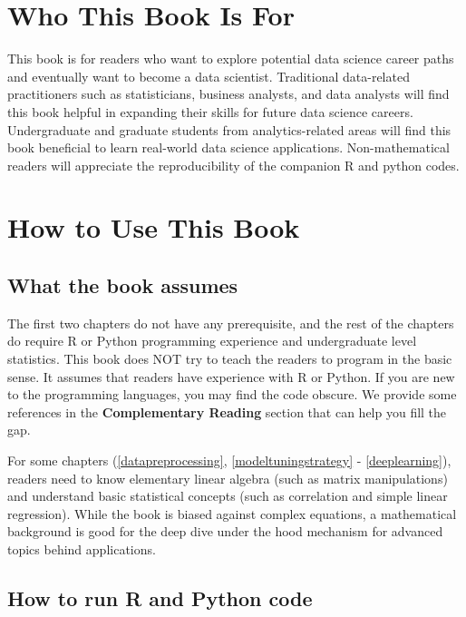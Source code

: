 \documentclass[
  12pt,
]{krantz}
\begin{document}
\hypertarget{who-this-book-is-for}{%
\section*{Who This Book Is For}\label{who-this-book-is-for}}


This book is for readers who want to explore potential data science career paths and eventually want to become a data scientist. Traditional data-related practitioners such as statisticians, business analysts, and data analysts will find this book helpful in expanding their skills for future data science careers. Undergraduate and graduate students from analytics-related areas will find this book beneficial to learn real-world data science applications. Non-mathematical readers will appreciate the reproducibility of the companion R and python codes.

\hypertarget{how-to-use-this-book}{%
\section*{How to Use This Book}\label{how-to-use-this-book}}


\hypertarget{what-the-book-assumes}{%
\subsection*{What the book assumes}\label{what-the-book-assumes}}


The first two chapters do not have any prerequisite, and the rest of the chapters do require R or Python programming experience and undergraduate level statistics. This book does NOT try to teach the readers to program in the basic sense. It assumes that readers have experience with R or Python.
If you are new to the programming languages, you may find the code obscure. We provide some references in the \textbf{Complementary Reading} section that can help you fill the gap.

For some chapters (\ref{datapreprocessing}, \ref{modeltuningstrategy} - \ref{deeplearning}), readers need to know elementary linear algebra (such as matrix manipulations) and understand basic statistical concepts (such as correlation and simple linear regression). While the book is biased against complex equations, a mathematical background is good for the deep dive under the hood mechanism for advanced topics behind applications.

\hypertarget{how-to-run-r-and-python-code}{%
\subsection*{How to run R and Python code}\label{how-to-run-r-and-python-code}}
\end{document}

